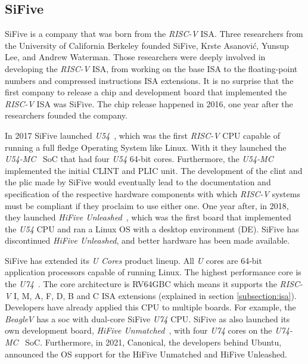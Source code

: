 \subsection{SiFive}
SiFive is a company that was born from the \textit{RISC-V} ISA. Three researchers from the University of California Berkeley founded SiFive, Krste Asanović, Yunsup Lee, and Andrew Waterman. Those researchers were deeply involved in developing the \textit{RISC-V} ISA, from working on the base ISA to the floating-point numbers and compressed instructions ISA extensions. It is no surprise that the first company to release a chip and development board that implemented the \textit{RISC-V} ISA was SiFive. The chip release happened in 2016, one year after the researchers founded the company.

In 2017 SiFive launched \textit{U54}~\cite{u54}, which was the first \textit{RISC-V} CPU capable of running a full fledge Operating System like Linux. With it they launched the \textit{U54-MC}~\cite{u54-mc} SoC that had four \textit{U54} 64-bit cores. Furthermore, the \textit{U54-MC} implemented the initial CLINT and PLIC unit. The development of the \acrshort{clint} and the \acrshort{plic} made by SiFive would eventually lead to the documentation and specification of the respective hardware components with which \textit{RISC-V} systems must be compliant if they proclaim to use either one. One year after, in 2018, they launched \textit{HiFive Unleashed}~\cite{hifive_unleashed}, which was the first board that implemented the \textit{U54} CPU and ran a Linux OS with a desktop environment (DE). SiFive has discontinued \textit{HiFive Unleashed}, and better hardware has been made available.

SiFive has extended its \textit{U Cores} product lineup. All \textit{U} cores are 64-bit application processors capable of running Linux. The highest performance core is the \textit{U74}~\cite{u74}. The core architecture is RV64GBC which means it supports the \textit{RISC-V} I, M, A, F, D, B and C ISA extensions (explained in section \ref{subsection:isa}). Developers have already applied this CPU to multiple boards. For example, the \textit{BeagleV} has a \acrshort{soc} with dual-core SiFive \textit{U74} CPU. SiFive as also launched its own development board, \textit{HiFive Unmatched}~\cite{hifive_unmatched}, with four \textit{U74} cores on the \textit{U74-MC}~\cite{u74-mc} SoC. Furthermore, in 2021, Canonical, the developers behind Ubuntu, announced the OS support for the HiFive Unmatched and HiFive Unleashed.

